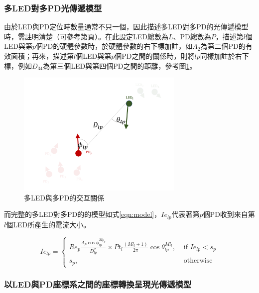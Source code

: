     \subsubsection{多LED對多PD光傳遞模型}
    \label{chp:model_mul}

    由於LED與PD定位時數量通常不只一個，因此描述多LED對多PD的光傳遞模型時，需註明清楚（可參考第\pageref{chp:symbol}頁）。在此設定LED總數為$L$、PD總數為$P$，描述第$l$個LED與第$p$個PD的硬體參數時，於硬體參數的右下標加註，如$A_2$為第二個PD的有效面積；再來，描述第$l$個LED與第$p$個PD之間的關係時，則將$lp$同樣加註於右下標，例如$D_{34}$為第三個LED與第四個PD之間的距離，參考圖\ref{pic:interactive_mul}。
    
    \begin{figure}[ht]
        \centering
        \includegraphics[width=8cm]{ch2pic/interactive_mul.png}
        \caption{多LED與多PD的交互關係}
        \label{pic:interactive_mul}
    \end{figure}

    而完整的多LED對多PD的的模型如式\ref{eqn:model}，$Ie_{lp}$代表著第$p$個PD收到來自第$l$個LED所產生的電流大小。
    
    \begin{equation}
        \label{eqn:model}
        Ie_{lp} = \begin{cases}Re_p \frac{ A_p\cos\phi_{lp}^{Mp_{p}} }{D^2_{lp}}\times Pt_l\frac{(Ml_{l}+1)}{2 \pi} \cos \theta_{lp}^{Ml_{l}}, & \text { if } Ie_{lp}<s_p \\ s_p, & \text { otherwise }\end{cases}
    \end{equation}

    




    \subsubsection{以LED與PD座標系之間的座標轉換呈現光傳遞模型}
    \label{chp:model_transform}

